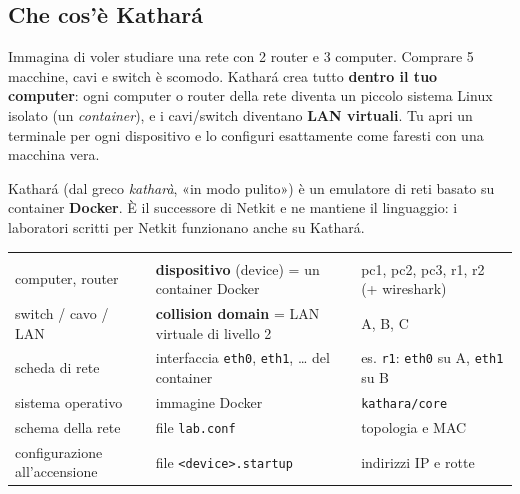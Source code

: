 
\subsection{Che cos'è Kathará}
\begin{intuizione}
Immagina di voler studiare una rete con 2 router e 3 computer. Comprare 5 macchine, cavi e switch è scomodo. Kathará crea tutto \textbf{dentro il tuo computer}: ogni computer o router della rete diventa un piccolo sistema Linux isolato (un \emph{container}), e i cavi/switch diventano \textbf{LAN virtuali}. Tu apri un terminale per ogni dispositivo e lo configuri esattamente come faresti con una macchina vera.
\end{intuizione}
Kathará (dal greco \emph{katharà}, «in modo pulito») è un emulatore di reti basato su container \textbf{Docker}. È il successore di Netkit e ne mantiene il linguaggio: i laboratori scritti per Netkit funzionano anche su Kathará.

\begin{center}
\begin{tabularx}{\linewidth}{l Y Y}
 &  & \\
computer, router & \textbf{dispositivo} (device) = un container Docker & pc1, pc2, pc3, r1, r2 (+ wireshark)\\
switch / cavo / LAN & \textbf{collision domain} = LAN virtuale di livello 2 & A, B, C\\
scheda di rete & interfaccia \texttt{eth0}, \texttt{eth1}, \dots{} del container & es. \texttt{r1}: \texttt{eth0} su A, \texttt{eth1} su B\\
sistema operativo & immagine Docker & \texttt{kathara/core}\\
schema della rete & file \texttt{lab.conf} & topologia e MAC\\
configurazione all'accensione & file \texttt{<device>.startup} & indirizzi IP e rotte\\
\end{tabularx}
\end{center}

